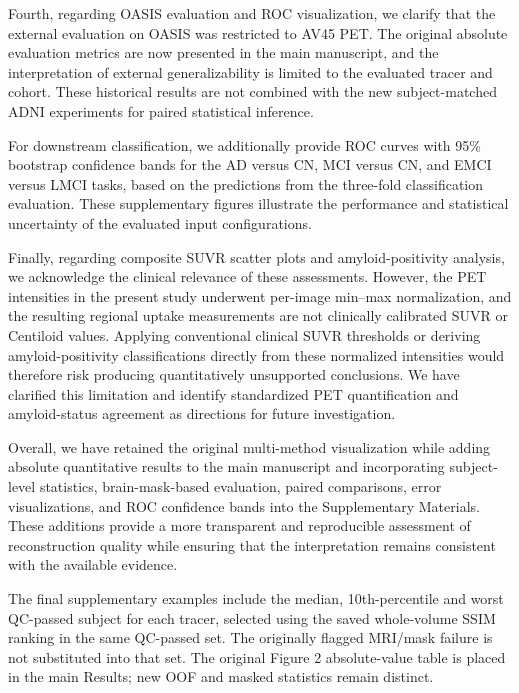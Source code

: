 {Fourth, regarding OASIS evaluation and ROC visualization, we clarify that the external evaluation on OASIS was restricted to AV45 PET. The original absolute evaluation metrics are now presented in the main manuscript, and the interpretation of external generalizability is limited to the evaluated tracer and cohort. These historical results are not combined with the new subject-matched ADNI experiments for paired statistical inference.

For downstream classification, we additionally provide ROC curves with 95\% bootstrap confidence bands for the AD versus CN, MCI versus CN, and EMCI versus LMCI tasks, based on the predictions from the three-fold classification evaluation. These supplementary figures illustrate the performance and statistical uncertainty of the evaluated input configurations.

Finally, regarding composite SUVR scatter plots and amyloid-positivity analysis, we acknowledge the clinical relevance of these assessments. However, the PET intensities in the present study underwent per-image min–max normalization, and the resulting regional uptake measurements are not clinically calibrated SUVR or Centiloid values. Applying conventional clinical SUVR thresholds or deriving amyloid-positivity classifications directly from these normalized intensities would therefore risk producing quantitatively unsupported conclusions. We have clarified this limitation and identify standardized PET quantification and amyloid-status agreement as directions for future investigation.

Overall, we have retained the original multi-method visualization while adding absolute quantitative results to the main manuscript and incorporating subject-level statistics, brain-mask-based evaluation, paired comparisons, error visualizations, and ROC confidence bands into the Supplementary Materials. These additions provide a more transparent and reproducible assessment of reconstruction quality while ensuring that the interpretation remains consistent with the available evidence.

The final supplementary examples include the median, 10th-percentile and worst QC-passed subject for each tracer, selected using the saved whole-volume SSIM ranking in the same QC-passed set. The originally flagged MRI/mask failure is not substituted into that set. The original Figure 2 absolute-value table is placed in the main Results; new OOF and masked statistics remain distinct.}

